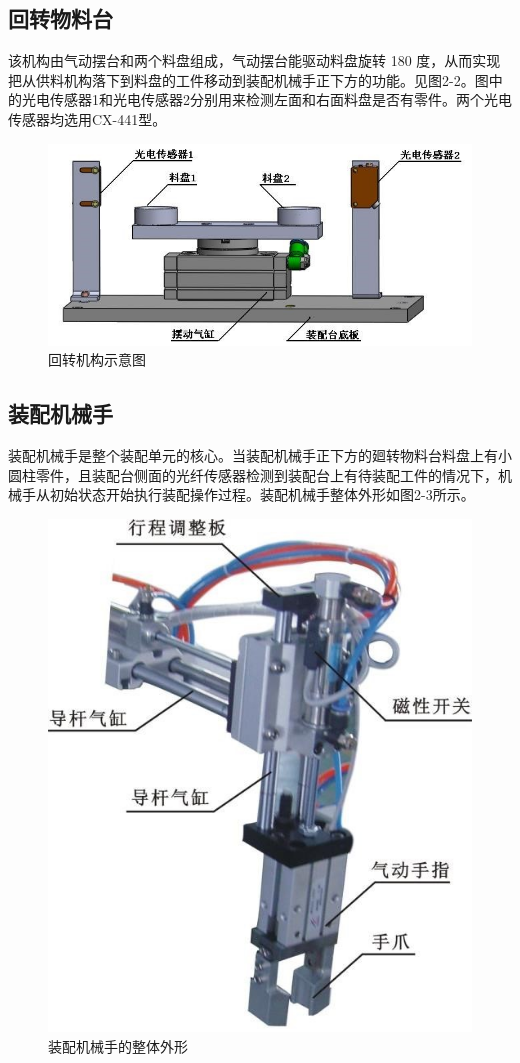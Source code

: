 \documentclass[12pt]{article}
\begin{document}
\subsection{回转物料台}
该机构由气动摆台和两个料盘组成，气动摆台能驱动料盘旋转 180 度，从而实现把从供料机构落下到料盘的工件移动到装配机械手正下方的功能。见图2-2。图中的光电传感器1和光电传感器2分别用来检测左面和右面料盘是否有零件。两个光电传感器均选用CX-441型。
\begin{figure}[htbp]
    \centering
    \includegraphics[scale=0.8]{fig/2-2.jpg}
    \caption{回转机构示意图}
\end{figure} 

\subsection{装配机械手}
装配机械手是整个装配单元的核心。当装配机械手正下方的廻转物料台料盘上有小圆柱零件，且装配台侧面的光纤传感器检测到装配台上有待装配工件的情况下，机械手从初始状态开始执行装配操作过程。装配机械手整体外形如图2-3所示。
\begin{figure}[htbp]
    \centering
    \includegraphics[scale=0.8]{fig/2-3.jpg}
    \caption{装配机械手的整体外形}
\end{figure} 
\end{document}
